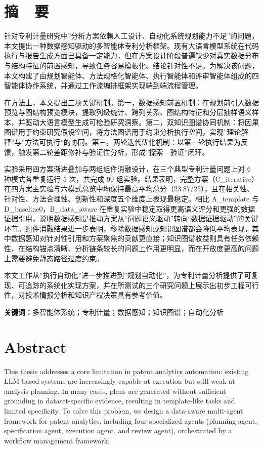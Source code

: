 \newpage
\section*{摘\ \ 要}

针对专利计量研究中”分析方案依赖人工设计、自动化系统规划能力不足”的问题，本文提出一种数据感知驱动的多智能体专利分析框架。现有大语言模型系统在代码执行与报告生成方面已具备一定能力，但在方案设计阶段普遍缺少对真实数据分布与结构特征的前置感知，导致任务容易模板化、结论针对性不足。为解决该问题，本文构建了由规划智能体、方法规格化智能体、执行智能体和评审智能体组成的四智能体协作系统，并通过工作流编排框架实现端到端流程管理。

在方法上，本文提出三项关键机制。第一，数据感知前置机制：在规划前引入数据预览与图结构预览模块，提取列级统计、跨列关系、图结构特征和分层抽样语义样本，并驱动大语言模型生成可检验研究洞察。第二，双知识图谱协同机制：将因果图谱用于约束研究假设空间，将方法图谱用于约束分析执行空间，实现”理论解释”与”方法可执行”的协同。第三，两轮迭代优化机制：以第一轮执行结果为反馈，触发第二轮差距修补与验证性分析，形成”探索—验证”闭环。

实验采用四方案渐进叠加与两组组件消融设计，在三个典型专利计量问题上对 6 种模式各重复运行 5 次，共完成 90 组实验。结果表明，完整方案（C\_iterative）在四方案主实验与六模式总览中均保持最高平均总分（23.87/25），且在相关性、针对性、方法合理性、创新性和深度五个维度上表现最稳定。相比 A\_template 与 D\_baseline0，B\_data\_aware 在重复实验中稳定取得更高语义评分和更强的数据证据引用，说明数据感知是推动方案从“问题语义驱动”转向“数据证据驱动”的关键环节。组件消融结果进一步表明，移除数据感知或知识图谱都会降低平均表现，其中数据感知对针对性引用和方案聚焦的贡献更直接；知识图谱收益则具有任务依赖性，在结构锚点清晰、分析链条较长的问题上作用更明显，而在开放度更高的问题上需要避免静态路径过度约束。

本文工作从”执行自动化”进一步推进到”规划自动化”，为专利计量分析提供了可复现、可追踪的系统化实现方案，并在所测试的三个研究问题上展示出初步工程可行性，对技术情报分析和知识产权决策具有参考价值。

\vspace{1em}
\noindent\textbf{关键词：}多智能体系统；专利计量；数据感知；知识图谱；自动化分析

\newpage
\section*{Abstract}

This thesis addresses a core limitation in patent analytics automation: existing LLM-based systems are increasingly capable at execution but still weak at analysis planning. In many cases, plans are generated without sufficient grounding in dataset-specific evidence, resulting in template-like tasks and limited specificity. To solve this problem, we design a data-aware multi-agent framework for patent analytics, including four specialized agents (planning agent, specification agent, execution agent, and review agent), orchestrated by a workflow management framework.

